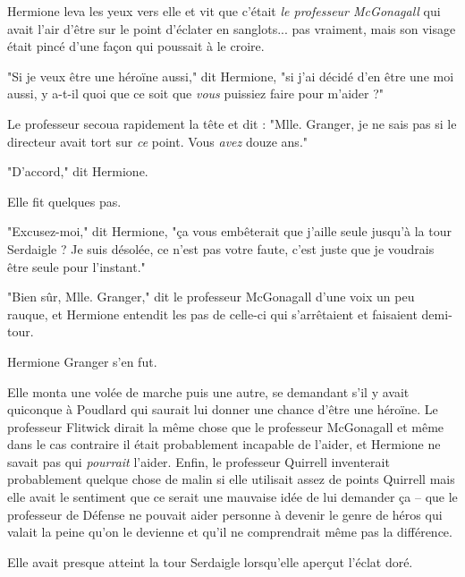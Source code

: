 Hermione leva les yeux vers elle et vit que c'était \emph{le professeur McGonagall } qui avait l'air d'être sur le point d'éclater en sanglots... pas vraiment, mais son visage était pincé d'une façon qui poussait à le croire.

"Si je veux être une héroïne aussi," dit Hermione, "si j'ai décidé d'en être une moi aussi, y a-t-il quoi que ce soit que \emph{vous } puissiez faire pour m'aider ?"

Le professeur secoua rapidement la tête et dit : "Mlle. Granger, je ne sais pas si le directeur avait tort sur \emph{ce}  point. Vous \emph{avez}  douze ans."

"D'accord," dit Hermione.

Elle fit quelques pas.

"Excusez-moi," dit Hermione, "ça vous embêterait que j'aille seule jusqu'à la tour Serdaigle ? Je suis désolée, ce n'est pas votre faute, c'est juste que je voudrais être seule pour l'instant."

"Bien sûr, Mlle. Granger," dit le professeur McGonagall d'une voix un peu rauque, et Hermione entendit les pas de celle-ci qui s'arrêtaient et faisaient demi-tour.

Hermione Granger s'en fut.

Elle monta une volée de marche puis une autre, se demandant s'il y avait quiconque à Poudlard qui saurait lui donner une chance d'être une héroïne. Le professeur Flitwick dirait la même chose que le professeur McGonagall et même dans le cas contraire il était probablement incapable de l'aider, et Hermione ne savait pas qui \emph{pourrait}  l'aider. Enfin, le professeur Quirrell inventerait probablement quelque chose de malin si elle utilisait assez de points Quirrell mais elle avait le sentiment que ce serait une mauvaise idée de lui demander ça – que le professeur de Défense ne pouvait aider personne à devenir le genre de héros qui valait la peine qu'on le devienne et qu'il ne comprendrait même pas la différence.

Elle avait presque atteint la tour Serdaigle lorsqu'elle aperçut l'éclat doré.

